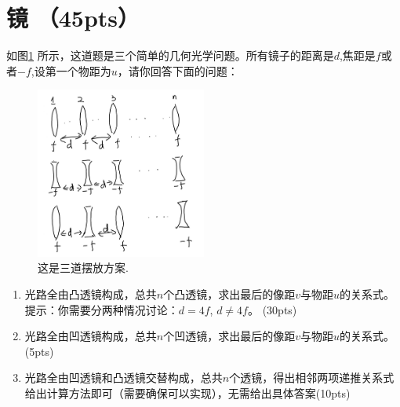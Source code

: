 \section{镜 （45pts）}
如图\ref{mirror} 所示，这道题是三个简单的几何光学问题。所有镜子的距离是\(d\),焦距是\(f\)或者\(-f\),设第一个物距为\(u\)，请你回答下面的问题：
\begin{figure}[htbp]
	\centering
	\includegraphics[width=0.5\textwidth]{mirror}
	\caption{这是三道摆放方案.}
	\label{mirror}
\end{figure}
\begin{enumerate}
	\item 光路全由凸透镜构成，总共\(n\)个凸透镜，求出最后的像距\(v\)与物距\(u\)的关系式。提示：你需要分两种情况讨论：\(d=4f\), \(d\neq 4f\)。 (30pts)
	\item 光路全由凹透镜构成，总共\(n\)个凹透镜，求出最后的像距\(v\)与物距\(u\)的关系式。(5pts)
	\item 光路全由凹透镜和凸透镜交替构成，总共\(n\)个透镜，得出相邻两项递推关系式给出计算方法即可（需要确保可以实现），无需给出具体答案(10pts) 
\end{enumerate}

